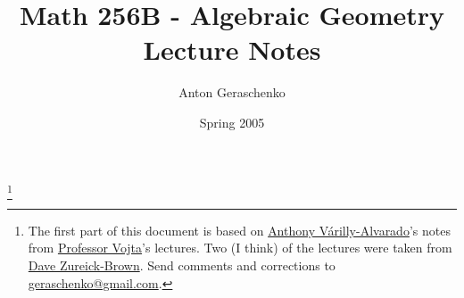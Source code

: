 \documentclass[11pt,reqno]{amsart}
\newcounter{lecture}
\theoremstyle{plain}
\theoremstyle{definition}
\theoremstyle{remark}
\begin{document}
 \title{Math 256B - Algebraic Geometry \\ Lecture Notes}
 \author{Anton Geraschenko}
 \date{Spring 2005}
 \thanks{
   The first part of this document is based on
   \href{http://math.rice.edu/~av15/}{Anthony V\'arilly-Alvarado}'s notes from
	 \href{https://math.berkeley.edu/~vojta}{Professor Vojta}'s lectures. Two (I
	 think) of the lectures were taken from
	 \href{http://www.mathcs.emory.edu/~dzb}{Dave Zureick-Brown}. Send comments
	 and corrections to
	 \href{mailto:geraschenko@gmail.com}{geraschenko@gmail.com}.
 }
 \maketitle

 {}
 {}
 {}
 {}
 {}
 {}
 {}
 {}
 {}
 {}
 {}
 {}
 {}
 {}
 {}
 {}
 {}
 {}
 {}
 {}
 {}
 {}
 {}
 {}
 {}
 {}
 {}
 {}
 {}
 {}
 {}
\end{document}
